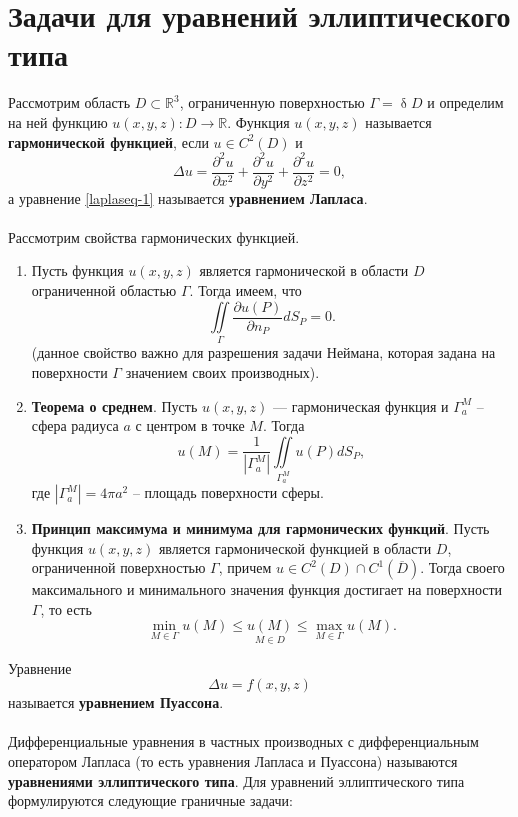 \documentclass[a4paper, 12pt]{report}
\numberwithin{equation}{section}
\renewcommand{\leq}{\leqslant}
\renewcommand{\delta}{\updelta}
\newcommand{\pderiv}[2]{\dfrac{\partial #1}{\partial #2}}
\newcommand{\pderivt}[2]{\frac{\partial^2 #1}{\partial #2^2}}
\begin{document}
	\section{Задачи для уравнений эллиптического типа}
	Рассмотрим область $D \subset \mathbb R^3$, ограниченную поверхностью $\Gamma = \delta D$ и определим на ней функцию $u(x,y,z):D \to \mathbb R$. Функция $u(x,y,z)$ называется \textbf{гармонической функцией}, если $u\in C^2(D)$ и
	\begin{equation}
		\label{laplaseq-1}
		\Delta u = \pderivt{u}{x} + \pderivt{u}{y} + \pderivt{u}{z} = 0,
	\end{equation}
	а уравнение \eqref{laplaseq-1} называется \textbf{уравнением Лапласа}.
	\\\\
	Рассмотрим свойства гармонических функцией.
	\begin{enumerate}
		\item Пусть функция $u(x,y,z)$ является гармонической в области $D$ ограниченной областью $\Gamma$. Тогда имеем, что
		$$\iint\limits_\Gamma \pderiv{u(P)}{n_P}dS_P=0.$$
		(данное свойство важно для разрешения задачи Неймана, которая задана на поверхности $\Gamma$ значением своих производных).
		\item \textbf{Теорема о среднем}. Пусть $u(x,y,z)$ --- гармоническая функция и $\Gamma_a^M$ -- сфера радиуса $a$ с центром в точке $M$.
		Тогда
		$$u(M)=\frac{1}{|\Gamma_a^M|}\iint\limits_{\Gamma_a^M}u(P)dS_P,$$
		где $|\Gamma_a^M|=4\pi a^2$ -- площадь поверхности сферы.
		\item \textbf{Принцип максимума и минимума для гармонических функций}. Пусть функция $u(x,y,z)$ является гармонической функцией в области $D$, ограниченной поверхностью $\Gamma$, причем $u\in C^2(D)\cap C^1(\overline{D})$. Тогда своего максимального и минимального значения функция достигает на поверхности $\Gamma$, то есть
		$$\min\limits_{M\in\Gamma}u(M)\leq \underset{M\in D}{u(M)}\leq \max\limits_{M\in\Gamma}u(M).$$
	\end{enumerate}
	Уравнение 
	\begin{equation}
		\Delta u = f(x,y,z)
	\end{equation}
	называется \textbf{уравнением Пуассона}.
	\\\\
	Дифференциальные уравнения в частных производных с дифференциальным оператором Лапласа (то есть уравнения Лапласа и Пуассона) называются \textbf{уравнениями эллиптического типа}. Для уравнений эллиптического типа формулируются следующие граничные задачи:
\end{document}
